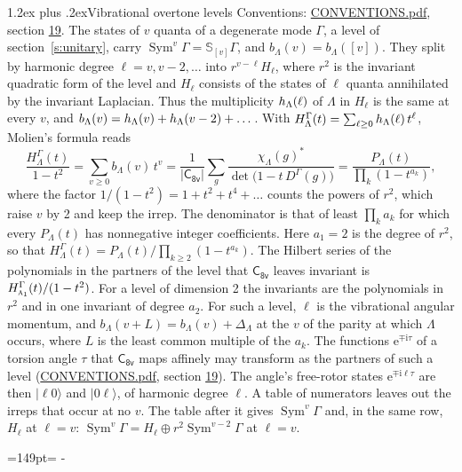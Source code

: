 \documentclass[10pt,a4paper]{article}
\makeatletter
\renewcommand\section{\@startsection{section}{1}{\z@}{-3ex plus -1ex minus -.2ex}%
  {1.2ex plus .2ex}{\normalfont\large\sffamily\bfseries\color{parttitle}}}
\newcommand{\needspace}[1]{\par\penalty-100\begingroup\dimen0=#1\relax\dimen2=\pagegoal
  \advance\dimen2-\pagetotal\ifdim\dimen0>\dimen2\relax\ifdim\dimen2>0pt\vfil\break\fi\fi
  \endgroup}
\numberwithin{equation}{section}
\newcommand{\grp}[1]{\mathsf{#1}}
\newcommand{\irr}[1]{\text{\normalfont\scshape #1}}
\newcommand{\iunit}{\mathrm{i}}
\newcommand{\expe}{\mathrm{e}}
\newcommand{\repD}[1]{D^{#1}}
\newcommand{\irchar}[1]{\chi_{#1}}
\newcommand{\conj}[1]{{#1}^{*}}
\newcommand{\schur}[1]{\mathbb{S}_{#1}}
\newcommand{\shape}[1]{[#1]}
\newcommand{\occ}[1]{\lvert #1\rangle}
\makeatother
\begin{document}
\section{Vibrational overtone levels}\label{s:overtones}
Conventions: \href{../../CONVENTIONS.pdf}{CONVENTIONS.pdf}, section \href{../../CONVENTIONS.pdf\#conv.19}{19}.
\leavevmode\label{n:index.quanta}\label{n:operator.symmetric.power}The states of $v$ quanta of a degenerate mode $\Gamma$, a level of section~\ref{s:unitary}, carry $\operatorname{Sym}^{v}\Gamma = \schur{\shape{v}}\Gamma$, and $b_\Lambda(v) = b_\Lambda(\shape{v})$. \label{n:local.quadratic.form}\label{n:set.harmonic}They split by harmonic degree $\ell = v, v - 2, \dots$ into $r^{v-\ell}H_\ell$, where $r^2$ is the invariant quadratic form of the level and $H_\ell$ consists of the states of $\ell$ quanta annihilated by the invariant Laplacian. \label{n:function.multiplicity.harmonic}Thus the multiplicity $\mathnormal{h}_\Lambda(\ell)$ of $\Lambda$ in $H_\ell$ is the same at every $v$, and $b_\Lambda(v) = \mathnormal{h}_\Lambda(v) + \mathnormal{h}_\Lambda(v - 2) + \dots$. \label{n:function.generating.level}With $H^{\Gamma}_\Lambda(t) = \sum_{\ell\ge0} \mathnormal{h}_\Lambda(\ell)\,t^{\ell}$, Molien's formula reads
\begin{equation}\label{e:molien}\frac{H^{\Gamma}_\Lambda(t)}{1 - t^2} = \sum_{v\ge0} b_\Lambda(v)\,t^v = \frac{1}{|\grp{C_{8v}}|}\sum_{g}\frac{\conj{\irchar{\Lambda}(g)}}{\det\bigl(1 - t\,\repD{\Gamma}(g)\bigr)} = \frac{P_\Lambda(t)}{\prod_k (1-t^{a_k})},\end{equation}
where the factor $1/(1 - t^2) = 1 + t^2 + t^4 + \dots$ counts the powers of $r^2$, which raise $v$ by 2 and keep the irrep. The denominator is that of least $\prod_k a_k$ for which every $P_\Lambda(t)$ has nonnegative integer coefficients. Here $a_1 = 2$ is the degree of $r^2$, so that $H^{\Gamma}_\Lambda(t) = P_\Lambda(t)/\prod_{k\ge2}(1 - t^{a_k})$. The Hilbert series of the polynomials in the partners of the level that $\grp{C_{8v}}$ leaves invariant is $H^{\Gamma}_{\irr{a}_{1}}(t)/(1 - t^2)$. For a level of dimension 2 the invariants are the polynomials in $r^2$ and in one invariant of degree $a_2$. \label{n:index.overtone.period}\label{n:index.increment.unitary}For such a level, $\ell$ is the vibrational angular momentum, and $b_\Lambda(v + L) = b_\Lambda(v) + \Delta_\Lambda$ at the $v$ of the parity at which $\Lambda$ occurs, where $L$ is the least common multiple of the $a_k$. \label{n:local.torsion.angle}The functions $\expe^{\mp\iunit\tau}$ of a torsion angle $\tau$ that $\grp{C_{8v}}$ maps affinely may transform as the partners of such a level (\href{../../CONVENTIONS.pdf}{CONVENTIONS.pdf}, section \href{../../CONVENTIONS.pdf\#conv.19}{19}). The angle's free-rotor states $\expe^{\mp\iunit\ell\tau}$ are then $\occ{\ell 0}$ and $\occ{0 \ell}$, of harmonic degree $\ell$. A table of numerators leaves out the irreps that occur at no $v$. The table after it gives $\operatorname{Sym}^{v}\Gamma$ and, in the same row, $H_\ell$ at $\ell = v$: $\operatorname{Sym}^{v}\Gamma = H_\ell \oplus r^2\operatorname{Sym}^{v-2}\Gamma$ at $\ell = v$.
\needspace{149pt}
\end{document}
